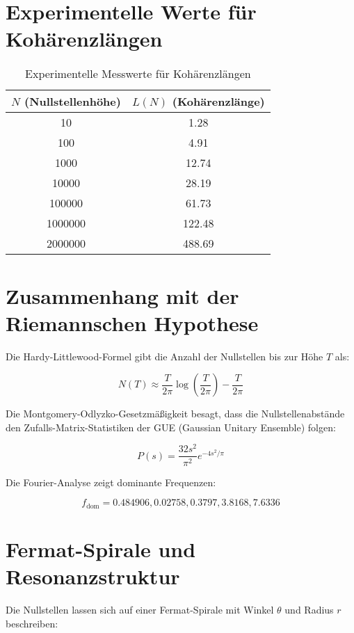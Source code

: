 \documentclass{article}
\begin{document}
\section{Experimentelle Werte für Kohärenzlängen}
\begin{table}[h]
\centering
\begin{tabular}{c|c}
\toprule
$N$ (Nullstellenhöhe) & $L(N)$ (Kohärenzlänge) \\
\midrule
10       & 1.28  \\
100      & 4.91  \\
1000     & 12.74  \\
10000    & 28.19  \\
100000   & 61.73  \\
1000000  & 122.48  \\
2000000  & 488.69  \\
\bottomrule
\end{tabular}
\caption{Experimentelle Messwerte für Kohärenzlängen}
\end{table}

\section{Zusammenhang mit der Riemannschen Hypothese}
Die Hardy-Littlewood-Formel gibt die Anzahl der Nullstellen bis zur Höhe \( T \) als:

\begin{equation}
N(T) \approx \frac{T}{2\pi} \log \left( \frac{T}{2\pi} \right) - \frac{T}{2\pi}
\end{equation}

Die Montgomery-Odlyzko-Gesetzmäßigkeit besagt, dass die Nullstellenabstände den Zufalls-Matrix-Statistiken der GUE (Gaussian Unitary Ensemble) folgen:

\begin{equation}
P(s) = \frac{32s^2}{\pi^2} e^{-4s^2/\pi}
\end{equation}

Die Fourier-Analyse zeigt dominante Frequenzen:

\begin{equation}
f_{\text{dom}} = 0.484906, 0.02758, 0.3797, 3.8168, 7.6336
\end{equation}

\section{Fermat-Spirale und Resonanzstruktur}
Die Nullstellen lassen sich auf einer Fermat-Spirale mit Winkel \( \theta \) und Radius \( r \) beschreiben:
\end{document}

